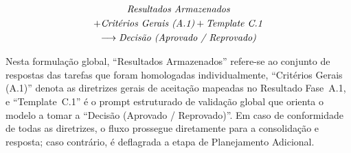 \documentclass[a4paper,10pt,twocolumn]{article}
\begin{document}
\begin{multline} \label{eq:fluxo_c1}
\text{\textit{Resultados Armazenados}} \\
+ \text{\textit{Critérios Gerais (A.1)}} + \text{\textit{Template C.1}} \\
\longrightarrow \text{\textit{Decisão (Aprovado / Reprovado)}}
\end{multline}

Nesta formulação global, ``Resultados Armazenados'' refere-se ao conjunto de respostas das tarefas que foram homologadas individualmente, ``Critérios Gerais (A.1)'' denota as diretrizes gerais de aceitação mapeadas no Resultado Fase~A.1, e ``Template~C.1'' é o prompt estruturado de validação global que orienta o modelo a tomar a ``Decisão (Aprovado / Reprovado)''. Em caso de conformidade de todas as diretrizes, o fluxo prossegue diretamente para a consolidação e resposta; caso contrário, é deflagrada a etapa de Planejamento Adicional.
\end{document}
